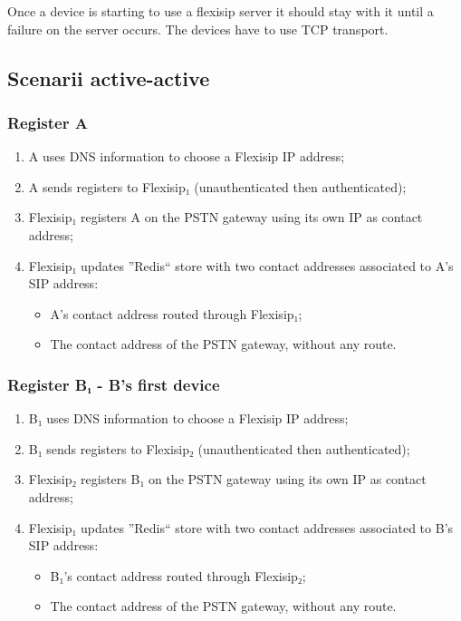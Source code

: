 \documentclass[a4paper,10pt]{article}
\begin{document}
Once a device is starting to use a flexisip server it should stay with it until a failure on the server occurs.
The devices have to use TCP transport.


\subsection{Scenarii active-active}

\subsubsection{Register A}
\begin{enumerate}
 \item A uses DNS information to choose a Flexisip IP address;
 \item A sends registers to Flexisip₁ (unauthenticated then authenticated);
 \item Flexisip₁ registers A on the PSTN gateway using its own IP as contact address;
 \item Flexisip₁ updates ''Redis`` store with two contact addresses associated to A's SIP address:
    \begin{itemize}
      \item A's contact address routed through Flexisip₁;
      \item The contact address of the PSTN gateway, without any route.
    \end{itemize}
\end{enumerate}

\subsubsection{Register B₁ - B's first device}
\begin{enumerate}
 \item B₁ uses DNS information to choose a Flexisip IP address;
 \item B₁ sends registers to Flexisip₂ (unauthenticated then authenticated);
 \item Flexisip₂ registers B₁ on the PSTN gateway using its own IP as contact address;
 \item Flexisip₁ updates ''Redis`` store with two contact addresses associated to B's SIP address:
    \begin{itemize}
      \item B₁'s contact address routed through Flexisip₂;
      \item The contact address of the PSTN gateway, without any route.
    \end{itemize}
\end{enumerate}
\end{document}
